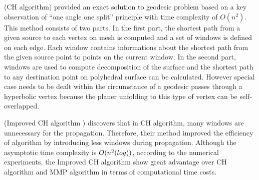 (CH algorithm) provided an exact solution to geodesic problem based on a key observation of ``one angle one split'' principle with time complexity of $O (n^2)$. This method consists of two parts. In the first part, the shortest path from a given source to each vertex on mesh is computed and a set of windows is defined on each edge. Each window contains informations about the shortest path from the given source point to points on the current window. In the second part, windows are used to compute decomposition of the surface and the shortest path to any destination point on polyhedral surface can be calculated. However special case needs to be dealt within the circumstance of a geodesic passes through a hyperbolic vertex because the planer unfolding to this type of vertex can be self-overlapped.

(Improved CH algorithm ) discovers that in CH algorithm, many windows are unnecessary for the propagation. Therefore, their method improved the efficiency of algorithm by introducing less windows during propagation. Although the asymptotic time complexity is $O(n^2\textup(log))$, according to the numerical experiments, the Improved CH algorithm show great advantage over CH algorithm and MMP algorithm in terms of computational time costs.

%
%

